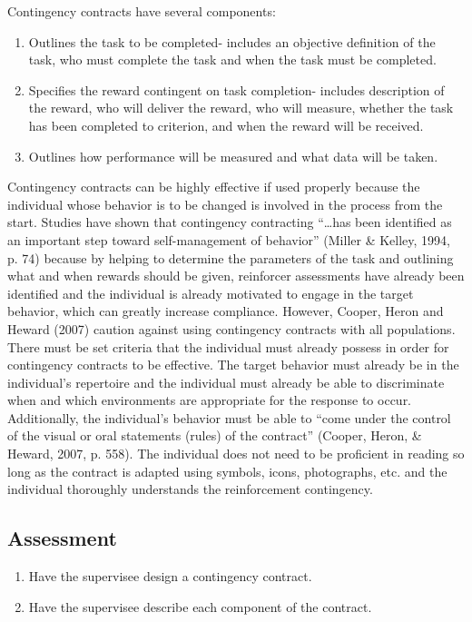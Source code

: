 Contingency contracts have several components: 
\begin{enumerate}
\item Outlines the task to be completed- includes an objective definition of the task, who must complete the task and when the task must be completed.
\item Specifies the reward contingent on task completion- includes description of the reward, who will deliver the reward, who will measure, whether the task has been completed to criterion, and when the reward will be received.
\item Outlines how performance will be measured and what data will be taken. 
\end{enumerate}

Contingency contracts can be highly effective if used properly because the individual whose behavior is to be changed is involved in the process from the start. Studies have shown that contingency contracting ``…has been identified as an important step toward self-management of behavior'' (Miller \& Kelley, 1994, p. 74) because by helping to determine the parameters of the task and outlining what and when rewards should be given, reinforcer assessments have already been identified and the individual is already motivated to engage in the target behavior, which can greatly increase compliance. However, Cooper, Heron and Heward (2007) caution against using contingency contracts with all populations. There must be set criteria that the individual must already possess in order for contingency contracts to be effective. The target behavior must already be in the individual's repertoire and the individual must already be able to discriminate when and which environments are appropriate for the response to occur. Additionally, the individual's behavior must be able to ``come under the control of the visual or oral statements (rules) of the contract'' (Cooper, Heron, \& Heward, 2007, p. 558).  The individual does not need to be proficient in reading so long as the contract is adapted using symbols, icons, photographs, etc. and the individual thoroughly understands the reinforcement contingency. 
%
\subsection{Assessment}
\begin{enumerate}
\item Have the supervisee design a contingency contract.
\item Have the supervisee describe each component of the contract.
\end{enumerate}
%
